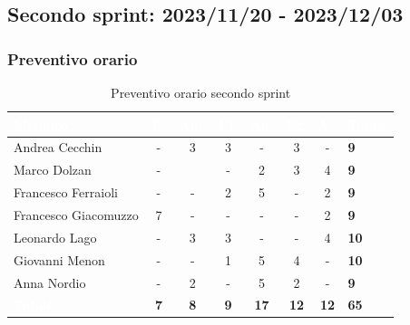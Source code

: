 \newpage


\subsection{Secondo sprint: 2023/11/20 - 2023/12/03}

\subsubsection{Preventivo orario}

{
\setlength{\tabcolsep}{10pt}
\renewcommand{\arraystretch}{1.5}
\begin{table}[h!]
    \centering
    \begin{tabularx}{\textwidth}{| l | c | c | c | c | c | c | X |}
        \hline
        \rowcolor{headerrow} \textbf{\textcolor{white}{Membro}} & \textbf{\textcolor{white}{R.}} & \textbf{\textcolor{white}{Am.}} & \textbf{\textcolor{white}{Pj.}} & \textbf{\textcolor{white}{An.}} & \textbf{\textcolor{white}{Pg.}} & \textbf{\textcolor{white}{V.}} & \textbf{\textcolor{white}{Totale}} \\
        \hline
        Andrea Cecchin & - & 3 & 3 & - & 3 & - & \textbf{9} \\
        \hline
        Marco Dolzan & - &  & - & 2 & 3 & 4 & \textbf{9} \\
        \hline
        Francesco Ferraioli & - & - & 2 & 5 & - & 2 & \textbf{9} \\
        \hline  
        Francesco Giacomuzzo & 7 & - & - & - & - & 2 & \textbf{9} \\
        \hline
        Leonardo Lago & - & 3 & 3 & - & - & 4 & \textbf{10} \\
        \hline
        Giovanni Menon & - & - & 1 & 5 & 4 & - & \textbf{10} \\
        \hline
        Anna Nordio & - & 2 & - & 5 & 2 & - & \textbf{9} \\
        \hline
    \cellcolor{headerrow} \textbf{\textcolor{white}{Totale}} & \textbf{7} & \textbf{8} & \textbf{9} & \textbf{17} & \textbf{12} & \textbf{12} & \textbf{65} \\
        \hline
    \end{tabularx} 
    \caption{Preventivo orario secondo sprint}
    \label{tab:preventivoorariosecondosprint}
\end{table}
}

